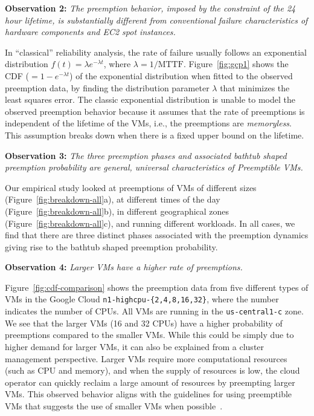 \documentclass[sigconf]{acmart} %
\begin{document}
\noindent \textbf{Observation 2:} \emph{The preemption behavior, imposed by the constraint of the 24 hour lifetime, is substantially different from conventional failure characteristics of hardware components and EC2 spot instances.}

\noindent In ``classical'' reliability analysis, the rate of failure  usually follows an exponential distribution $f(t) = \lambda e^{-\lambda t}$, where $\lambda=1/\text{MTTF}$.
Figure~\ref{fig:gcp1} shows the CDF ($=1-e^{-\lambda t}$) of the exponential distribution when fitted to the observed preemption data, by finding the distribution parameter $\lambda$ that minimizes the least squares error.
The classic exponential distribution is unable to model the observed preemption behavior because it assumes that the rate of preemptions is independent of the lifetime of the VMs, i.e., the preemptions are \emph{memoryless}.
This assumption breaks down when there is a fixed upper bound on the lifetime. 

\noindent \textbf{Observation 3:} \emph{The three preemption phases and associated bathtub shaped preemption probability are general, universal characteristics of Preemptible VMs.}

Our empirical study looked at preemptions of VMs of different sizes (Figure~\ref{fig:breakdown-all}a), at different times of the day (Figure~\ref{fig:breakdown-all}b), in different geographical zones (Figure~\ref{fig:breakdown-all}c), and running different workloads. 
In all cases, we find that there are three distinct phases associated with the preemption dynamics giving rise to the bathtub shaped preemption probability. 

\noindent \textbf{Observation 4:}\emph{ Larger VMs have a higher rate of preemptions.}

Figure~\ref{fig:cdf-comparison} shows the preemption data from five different types of VMs in the Google Cloud \texttt{n1-highcpu-\{2,4,8,16,32\}}, where the number indicates the number of CPUs.
All VMs are running in the \texttt{us-central1-c} zone. 
We see that the larger VMs (16 and 32 CPUs) have a higher probability of preemptions compared to the smaller VMs.
While this could be simply due to higher demand for larger VMs, it can also be explained from a cluster management perspective. 
Larger VMs require more computational resources (such as CPU and memory), and when the supply of resources is low, the cloud operator can quickly reclaim a large amount of resources by preempting larger VMs.
This observed behavior aligns with the guidelines for using preemptible VMs that suggests the use of smaller VMs when possible~\cite{preemptible-documentation}. 
\end{document}
